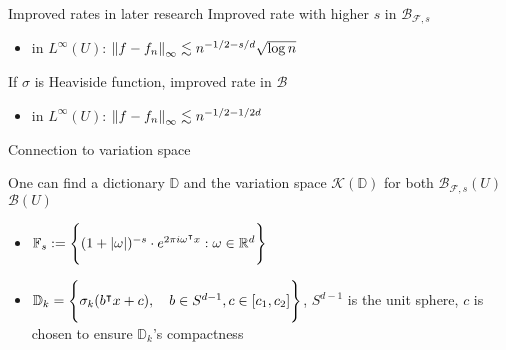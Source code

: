 \documentclass[aspectratio=32]{beamer}
\begin{document}
\begin{frame}{Improved rates in later research}
    Improved rate with higher $s$ in $\mathcal{B}_{\mathcal{F},s}$ \cite{barronApproximationEstimationHighDimensional2018}
    \begin{itemize}
        \item in $L^{\infty}(U)$: $\left\| f - f_n \right\|_{\infty} \lesssim n^{-1/2-s/d} \sqrt{\log{n}} $
    \end{itemize}
    If $\sigma$ is Heaviside function, improved rate in $\mathcal{B}$ \cite{maUniformApproximationRates2022}
    \begin{itemize}
        \item in $L^{\infty}(U)$: $\left\| f - f_n \right\|_{\infty} \lesssim n^{-1/2 - 1/2d}$
    \end{itemize}
\end{frame}




\begin{frame}{Connection to variation space}

    One can find a dictionary $\mathbb{D}$ and the variation space
    $\mathcal{K}(\mathbb{D})$ for both
    $\mathcal{B}_{\mathcal{F},s}(U)$
    $\mathcal{B}(U)$

    \begin{itemize}
        \item $\mathbb{F}_s := \Bigg\{ (1 + \left| \omega \right|)^{-s} \cdot e^{2\pi
                          i\omega{}^{\intercal} x}: \omega \in \mathbb{R}^d \Bigg\}$
        \item $\mathbb{D}_{k} = \Bigg\{ \sigma_k(b{}^{\intercal} x + c), \quad b\in
                  S^{d-1}, c\in [c_1, c_2] \Bigg\}$, $S^{d-1}$ is the unit sphere, $c$
              is chosen to ensure $\mathbb{D}_{k}$'s compactness
    \end{itemize}

\end{frame}
\end{document}
